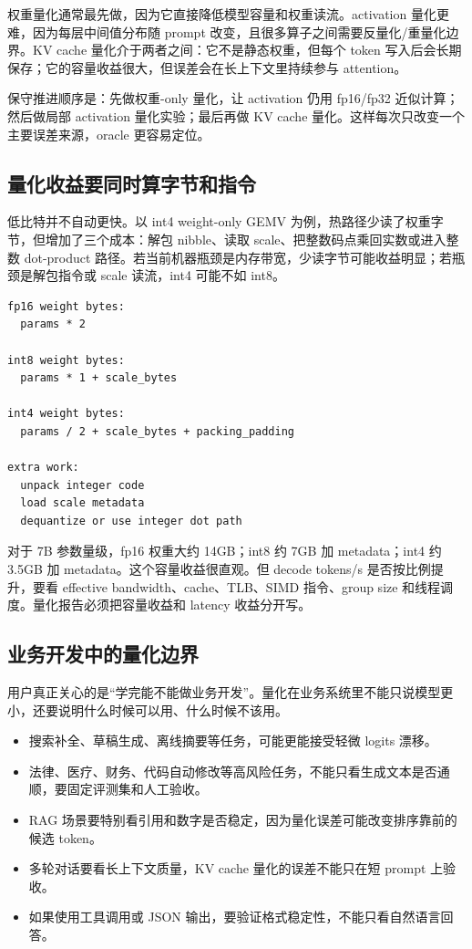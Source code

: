 权重量化通常最先做，因为它直接降低模型容量和权重读流。activation 量化更难，因为每层中间值分布随 prompt 改变，且很多算子之间需要反量化/重量化边界。KV cache 量化介于两者之间：它不是静态权重，但每个 token 写入后会长期保存；它的容量收益很大，但误差会在长上下文里持续参与 attention。

保守推进顺序是：先做权重-only 量化，让 activation 仍用 fp16/fp32 近似计算；然后做局部 activation 量化实验；最后再做 KV cache 量化。这样每次只改变一个主要误差来源，oracle 更容易定位。

\subsection{量化收益要同时算字节和指令}

低比特并不自动更快。以 int4 weight-only GEMV 为例，热路径少读了权重字节，但增加了三个成本：解包 nibble、读取 scale、把整数码点乘回实数或进入整数 dot-product 路径。若当前机器瓶颈是内存带宽，少读字节可能收益明显；若瓶颈是解包指令或 scale 读流，int4 可能不如 int8。

\begin{lstlisting}[numbers=none,caption={weight-only 量化的粗略收益账}]
fp16 weight bytes:
  params * 2

int8 weight bytes:
  params * 1 + scale_bytes

int4 weight bytes:
  params / 2 + scale_bytes + packing_padding

extra work:
  unpack integer code
  load scale metadata
  dequantize or use integer dot path
\end{lstlisting}

对于 7B 参数量级，fp16 权重大约 14GB；int8 约 7GB 加 metadata；int4 约 3.5GB 加 metadata。这个容量收益很直观。但 decode tokens/s 是否按比例提升，要看 effective bandwidth、cache、TLB、SIMD 指令、group size 和线程调度。量化报告必须把容量收益和 latency 收益分开写。

\subsection{业务开发中的量化边界}

用户真正关心的是“学完能不能做业务开发”。量化在业务系统里不能只说模型更小，还要说明什么时候可以用、什么时候不该用。

\begin{itemize}
  \item 搜索补全、草稿生成、离线摘要等任务，可能更能接受轻微 logits 漂移。
  \item 法律、医疗、财务、代码自动修改等高风险任务，不能只看生成文本是否通顺，要固定评测集和人工验收。
  \item RAG 场景要特别看引用和数字是否稳定，因为量化误差可能改变排序靠前的候选 token。
  \item 多轮对话要看长上下文质量，KV cache 量化的误差不能只在短 prompt 上验收。
  \item 如果使用工具调用或 JSON 输出，要验证格式稳定性，不能只看自然语言回答。
\end{itemize}

